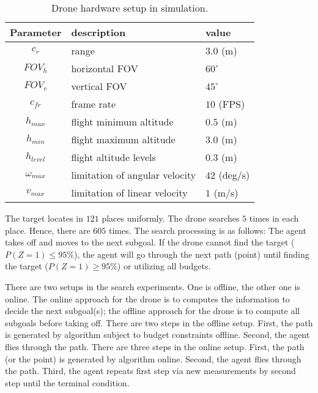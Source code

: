 \begin{table}[htbp]
   \caption{Drone hardware setup in simulation.}
   \begin{center}
     \begin{tabular}{|| c | l | l ||}
     \hline
     Parameter & description & value\\ [0.5ex]
     \hline\hline
     $c_r$ & range & $3.0$ (m) \\
     \hline
     $FOV_h$ & horizontal FOV & $60^{\circ}$ \\
     \hline
     $FOV_v$ & vertical FOV & $45^{\circ}$ \\
     \hline
     $c_{fr}$ & frame rate & $10$ (FPS) \\
     \hline\hline
     $h_{max}$ & flight minimum altitude & $0.5$ (m) \\
     \hline
     $h_{min}$ & flight maximum altitude & $3.0$ (m) \\
     \hline
     $h_{level}$ & flight altitude levels & $0.3$ (m) \\
     \hline
     $\omega_{max}$ & limitation of angular velocity & $42$ (deg/s) \\
     \hline
     $v_{max}$ & limitation of linear velocity & $1$ (m/s) \\
     \hline
    \end{tabular}
   \end{center}
   \label{tab:drone_info}
\end{table}

The target locates in $121$ places uniformly. The drone searches $5$ times in each place.
Hence, there are $605$ times.
The search processing is as follows: The agent takes off and moves to the next subgoal.
If the drone cannot find the target ($P(Z=1) \le 95 \%$), the agent will go through the next path (point) until finding the target ($P(Z=1)\ge 95 \%$) or utilizing all budgets.

There are two setups in the search experiments.
One is offline, the other one is online.
The online approach for the drone is to computes the information to decide the next subgoal(s);
the offline approach for the drone is to compute all subgoals before taking off.
There are two steps in the offline setup.
First, the path is generated by algorithm subject to budget constraints offline.
Second, the agent flies through the path.
There are three steps in the online setup.
First, the path (or the point) is generated by algorithm online.
Second, the agent flies through the path.
Third, the agent repeats first step via new measurements by second step until the terminal condition.

